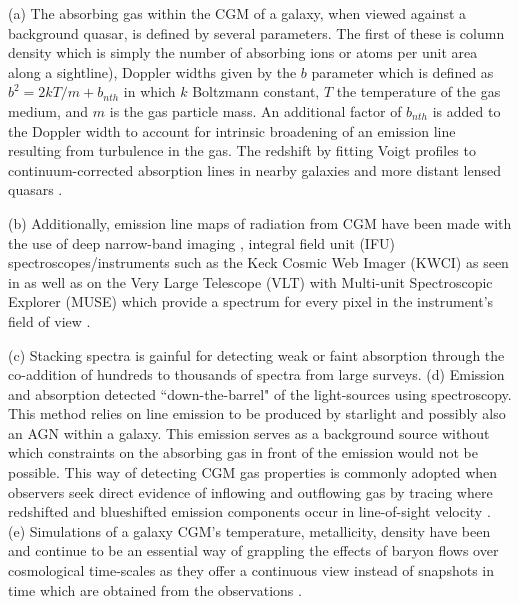 \documentclass[10pt,a4paper]{article}
\begin{document}
(a) The absorbing gas within the CGM of a galaxy, when viewed against a background quasar, is defined by several  parameters. The first of these is column density which is simply the number of absorbing ions or atoms per unit area along a sightline), Doppler widths given by the $b$ parameter which is defined as $b^2 = 2kT/m + b_{nth}$ in which $k$ Boltzmann constant, $T$ the temperature of the gas medium, and $m$ is the gas particle mass. An additional factor of $b_{nth}$ is added to the Doppler width to account for intrinsic broadening of an emission line resulting from turbulence in the gas. The redshift by fitting Voigt profiles to continuum-corrected absorption lines in nearby galaxies \citep[e.g.][]{Lehner2015,Bowen2016} and more distant lensed quasars \citep[][]{RauchHaehnelt2011, Rubin2015}. 

(b) Additionally, emission line maps of radiation from CGM have been made with the use of deep narrow-band imaging \citep{Prescott2015,Arrigoni-Battaia2016}, integral field unit (IFU) spectroscopes/instruments such as the Keck Cosmic Web Imager (KWCI) as seen in \citet{Cai2018} as well as on the Very Large Telescope (VLT) with Multi-unit Spectroscopic Explorer (MUSE) which provide a spectrum for every pixel in the instrument's field of view \citep[e.g.][]{Cantalupo2014}. 

(c) Stacking spectra is gainful for detecting weak or faint absorption through the co-addition of hundreds to thousands of spectra from large surveys. (d) Emission and absorption detected ``down-the-barrel" of the light-sources using spectroscopy. This method relies on line emission to be produced by starlight and possibly also an AGN within a galaxy. This emission serves as a background source without which constraints on the absorbing gas in front of the emission would not be possible. This way of detecting CGM gas properties is commonly adopted when observers seek direct evidence of inflowing and outflowing gas by tracing where redshifted and blueshifted emission components occur in line-of-sight velocity \citep[][]{Steidel2010,Heckman2015}. (e) Simulations of a galaxy CGM's temperature, metallicity, density have been and continue to be an essential way of grappling the effects of baryon flows over cosmological time-scales as they offer a continuous view instead of snapshots in time which are obtained from the observations \citep[][]{SomervilleDave2015}.
\end{document}
